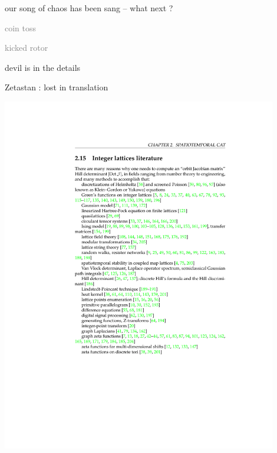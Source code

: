 \begin{frame}{our song of chaos has been sang -- what next ?}
\begin{enumerate}
              \item \textcolor{gray}{\small
coin toss
              \item
kicked rotor
              \item
\catlatt
                  }
              \item {\Large
devil is in the details
                    }
            \end{enumerate}
\end{frame} %

\begin{frame}{Zetastan : lost in translation}
\begin{center}
\hfill\includegraphics[width=0.90\textwidth]{../kittens/lattLitClip1}
\end{center}
\end{frame} %

